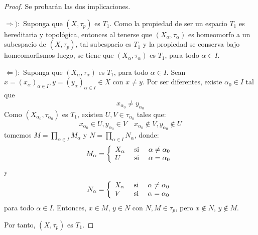 \documentclass[12pt]{report}
\theoremstyle{largebreak}
\begin{document}
    \begin{proof}
        Se probarán las dos implicaciones.

        $\Rightarrow):$ Suponga que $(X,\tau_p)$ es $T_1$. Como la propiedad de ser un espacio $T_1$ es hereditaria y topológica, entonces al tenerse que $(X_\alpha,\tau_\alpha)$ es homeomorfo a un subespacio de $(X,\tau_p)$, tal subespacio es $T_1$ y la propiedad se conserva bajo homeomorfismos luego, se tiene que $(X_\alpha,\tau_\alpha)$ es $T_1$, para todo $\alpha\in I$.

        $\Leftarrow):$ Suponga que $(X_\alpha,\tau_\alpha)$ es $T_1$, para todo $\alpha\in I$. Sean $x=\left(x_\alpha\right)_{\alpha\in I},y=\left(y_\alpha\right)_{\alpha\in I}\in X$ con $x\neq y$. Por ser diferentes, existe $\alpha_0\in I$ tal que
        \begin{equation*}
            x_{\alpha_0}\neq y_{\alpha_0}
        \end{equation*}
        Como $(X_{\alpha_0},\tau_{\alpha_0})$ es $T_1$, existen $U,V\in\tau_{\alpha_0}$ tales que:
        \begin{equation*}
            x_{\alpha_0}\in U,y_{\alpha_0}\in V\quad x_{\alpha_0}\notin V,y_{\alpha_0}\notin U
        \end{equation*}
        tomemos $M=\prod_{\alpha\in I}M_\alpha$ y $N=\prod_{\alpha\in I}N_\alpha$, donde:
        \begin{equation*}
            M_\alpha=\left\{
                \begin{array}{lcr}
                    X_\alpha & \textup{ si } & \alpha\neq\alpha_0\\
                    U & \textup{ si } & \alpha=\alpha_0\\
                \end{array}
            \right.
        \end{equation*}
        y
        \begin{equation*}
            N_\alpha=\left\{
                \begin{array}{lcr}
                    X_\alpha & \textup{ si } & \alpha\neq\alpha_0\\
                    V & \textup{ si } & \alpha=\alpha_0\\
                \end{array}
            \right.
        \end{equation*}
        para todo $\alpha\in I$. Entonces, $x\in M$, $y\in N$ con $N,M\in\tau_p$, pero $x\notin N$, $y\notin M$.

        Por tanto, $(X,\tau_p)$ es $T_1$.
    \end{proof}
\end{document}
